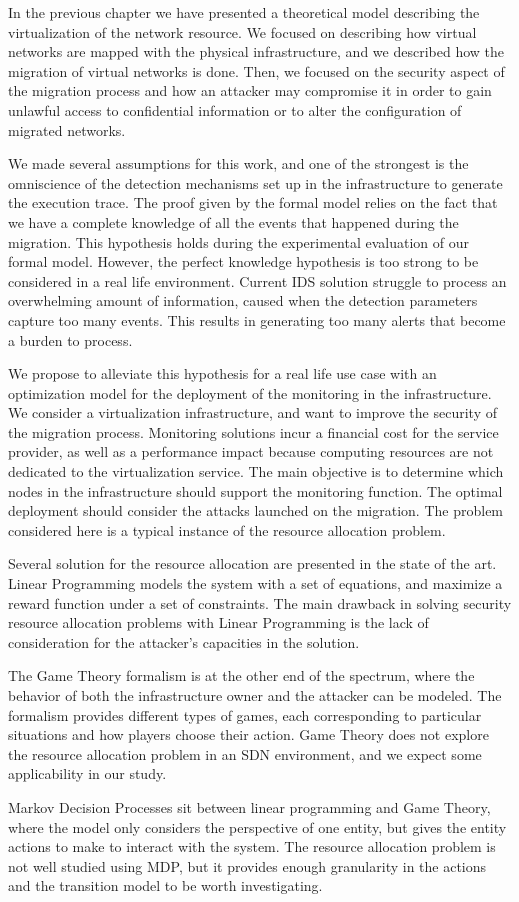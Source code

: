 In the previous chapter we have presented a theoretical model describing the virtualization of the network resource. We focused on describing how virtual networks are mapped with the physical infrastructure, and we described how the migration of virtual networks is done. Then, we focused on the security aspect of the migration process and how an attacker may compromise it in order to gain unlawful access to confidential information or to alter the configuration of migrated networks.

We made several assumptions for this work, and one of the strongest is the omniscience of the detection mechanisms set up in the infrastructure to generate the execution trace. The proof given by the formal model relies on the fact that we have a complete knowledge of all the events that happened during the migration.  This hypothesis holds during the experimental evaluation of our formal model. 
However, the perfect knowledge hypothesis is too strong to be considered in a real life environment. 
Current IDS solution struggle to process an overwhelming amount of information, caused when the detection parameters capture too many events. This results in generating too many alerts that become a burden to process.

We propose to alleviate this hypothesis for a real life use case with an optimization model for the deployment of the monitoring in the infrastructure.
We consider a virtualization infrastructure, and want to improve the security of the migration process.
Monitoring solutions incur a financial cost for the service provider, as well as a performance impact because computing resources are not dedicated to the virtualization service.
The main objective is to determine which nodes in the infrastructure should support the monitoring function.
The optimal deployment should consider the attacks launched on the migration.
The problem considered here is a typical instance of the resource allocation problem.

Several solution for the resource allocation are presented in the state of the art. 
Linear Programming models the system with a set of equations, and maximize a reward function under a set of constraints.
The main drawback in solving security resource allocation problems with Linear Programming is the lack of consideration for the attacker's capacities in the solution.

The Game Theory formalism is at the other end of the spectrum, where the behavior of both the infrastructure owner and the attacker can be modeled.
The formalism provides different types of games, each corresponding to particular situations and how players choose their action.
Game Theory does not explore the resource allocation problem in an SDN environment, and we expect some applicability in our study.

Markov Decision Processes sit between linear programming and Game Theory, where the model only considers the perspective of one entity, but gives the entity actions to make to interact with the system. The resource allocation problem is not well studied using MDP, but it provides enough granularity in the actions and the transition model to be worth investigating.


